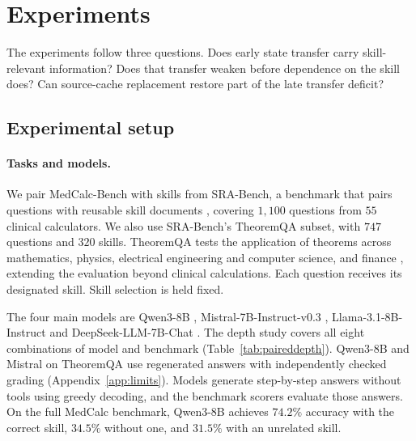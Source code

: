 \section{Experiments}
\label{sec:experiments}

The experiments follow three questions. Does early state transfer carry
skill-relevant information? Does that transfer weaken before dependence
on the skill does? Can source-cache replacement restore part of the late
transfer deficit?

\subsection{Experimental setup}
\label{sec:setup}
\label{sec:cells}

\paragraph{Tasks and models.}
We pair MedCalc-Bench \citep{khandekar2024medcalc} with skills from
SRA-Bench, a benchmark that pairs questions with reusable skill documents
\citep{su2026srabench}, covering $1{,}100$ questions from $55$
clinical calculators. We also use SRA-Bench's TheoremQA subset, with $747$
questions and $320$ skills. TheoremQA tests the application of theorems
across mathematics, physics, electrical engineering and computer science,
and finance \citep{chen2023theoremqa}, extending the evaluation beyond
clinical calculations. Each question receives its designated skill.
Skill selection is held fixed.

The four main models are Qwen3-8B \citep{yang2025qwen3},
Mistral-7B-Instruct-v0.3 \citep{jiang2023mistral}, Llama-3.1-8B-Instruct
\citep{grattafiori2024llama3} and DeepSeek-LLM-7B-Chat
\citep{deepseek2024llm}. The depth study covers all eight combinations of
model and benchmark (Table~\ref{tab:paireddepth}). Qwen3-8B and Mistral on
TheoremQA use regenerated answers with independently checked grading
(Appendix~\ref{app:limits}).
Models generate step-by-step answers without tools using greedy decoding,
and the benchmark scorers evaluate those answers. On the full MedCalc benchmark, Qwen3-8B
achieves $74.2\%$ accuracy with the correct skill, $34.5\%$ without one,
and $31.5\%$ with an unrelated skill.

\begin{table}[t]
\centering
\caption{Early transfer at $L2$ and fixed-layer controls at $L8$.
Entries are accuracy (\%), with separate question/skill counts ($n/G$)
for each block. $L2$ establishes effective early transfer across all eight
combinations. $L8$ tests content and position controls at a fixed depth,
which is already beyond some transfer boundaries. Sample selection is
specified in Section~\ref{sec:setup}.}
\label{tab:probe}
\normalfont\rmfamily\fontsize{9}{11}\selectfont
\renewcommand{\arraystretch}{1.18}
\setlength{\tabcolsep}{2pt}
\setlength{\heavyrulewidth}{0.7pt}
\setlength{\lightrulewidth}{0.3pt}
\setlength{\aboverulesep}{2pt}
\setlength{\belowrulesep}{2.5pt}

\end{table}

